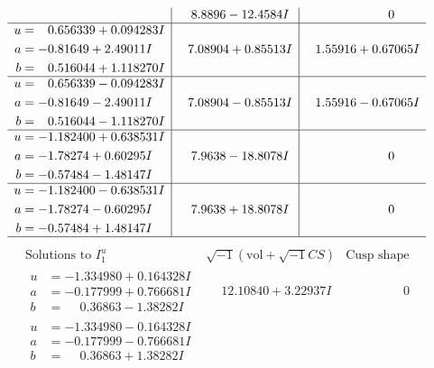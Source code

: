 \documentclass[1p]{elsarticle_modified}
\theoremstyle{definition}
\newcommand{\I}{\sqrt{-1}}
\begin{document}
$$\begin{array}{c|c|c}
 & \phantom{-}8.8896 - 12.4584 I & \phantom{-0.000000 } 0 \\ \hline\begin{aligned}
u &= \phantom{-}0.656339 + 0.094283 I \\
a &= -0.81649 + 2.49011 I \\
b &= \phantom{-}0.516044 + 1.118270 I\end{aligned}
 & \phantom{-}7.08904 + 0.85513 I & \phantom{-}1.55916 + 0.67065 I \\ \hline\begin{aligned}
u &= \phantom{-}0.656339 - 0.094283 I \\
a &= -0.81649 - 2.49011 I \\
b &= \phantom{-}0.516044 - 1.118270 I\end{aligned}
 & \phantom{-}7.08904 - 0.85513 I & \phantom{-}1.55916 - 0.67065 I \\ \hline\begin{aligned}
u &= -1.182400 + 0.638531 I \\
a &= -1.78274 + 0.60295 I \\
b &= -0.57484 - 1.48147 I\end{aligned}
 & \phantom{-}7.9638 - 18.8078 I & \phantom{-0.000000 } 0 \\ \hline\begin{aligned}
u &= -1.182400 - 0.638531 I \\
a &= -1.78274 - 0.60295 I \\
b &= -0.57484 + 1.48147 I\end{aligned}
 & \phantom{-}7.9638 + 18.8078 I & \phantom{-0.000000 } 0\\
 \hline 
 \end{array}$$\newpage$$\begin{array}{c|c|c}  
\text{Solutions to }I^u_{1}& \I (\text{vol} + \sqrt{-1}CS) & \text{Cusp shape}\\
 \hline 
\begin{aligned}
u &= -1.334980 + 0.164328 I \\
a &= -0.177999 + 0.766681 I \\
b &= \phantom{-}0.36863 - 1.38282 I\end{aligned}
 & \phantom{-}12.10840 + 3.22937 I & \phantom{-0.000000 } 0 \\ \hline\begin{aligned}
u &= -1.334980 - 0.164328 I \\
a &= -0.177999 - 0.766681 I \\
b &= \phantom{-}0.36863 + 1.38282 I\end{aligned}

\end{array}$$
\end{document}
